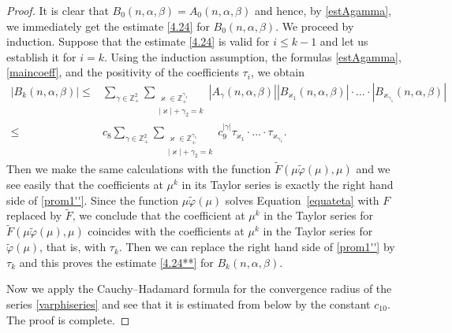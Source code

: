 \documentclass[10pt,a4paper]{amsart}
\def\a{\alpha}
\def\b{\beta}
\begin{document}
\begin{proof}
It is clear that $B_0(n,\a,\b)=A_0(n,\a,\b)$ and hence, by \eqref{estAgamma}, we immediately get
the estimate \eqref{4.24} for $B_0(n,\a,\b)$. We proceed by induction. Suppose that the estimate
\eqref{4.24} is valid for  $i\leqslant k-1$ and let us establish it for $i=k$. Using the induction assumption,
the formulas \eqref{estAgamma}, \eqref{maincoeff}, and the positivity of the coefficients $\tau_i$, we obtain
\begin{equation}\label{prom1''}
\begin{aligned}
|B_k(n,\a,\b)|\leqslant & \sum\limits_{\gamma\in\mathds{Z}_+^2}
\sum\limits_{\substack{\varkappa\in\mathds{Z}_+^{\gamma_1} \\ |\varkappa|+\gamma_2=k}}
|A_\gamma(n,\a,\b)||B_{\varkappa_1}(n,\a,\b)|\cdot\dots\cdot |B_{\varkappa_{\gamma_1}}(n,\a,\b)|
\\
\leqslant & c_{8}\sum\limits_{\gamma\in\mathds{Z}_+^2}
\sum\limits_{\substack{\varkappa\in\mathds{Z}_+^{\gamma_1} \\ |\varkappa|+\gamma_2=k}}
c_{9}^{|\gamma|}\tau_{\varkappa_1}\cdot\dots\cdot\tau_{\varkappa_{\gamma_1}}.
\end{aligned}
\end{equation}
Then we make the same calculations with the function
$\widetilde{F}(\mu\widetilde{\varphi}(\mu), \mu)$ and we see easily that the coefficients at $\mu^k$ in its Taylor series is exactly the right hand side of \eqref{prom1''}. Since the function $\mu\widetilde{\varphi}(\mu)$ solves Equation~\eqref{equateta}
with $F$ replaced by $\widetilde{F}$, we conclude that the coefficient at $\mu^k$ in the Taylor series for $\widetilde{F}(\mu\widetilde{\varphi}(\mu), \mu)$ coincides with the coefficients at $\mu^k$ in the Taylor series for $\widetilde{\varphi}(\mu)$, that is, with $\tau_k$. Then we can replace the right hand side of \eqref{prom1''} by $\tau_k$ and this proves the estimate \eqref{4.24**}
for $B_k(n, \alpha, \beta)$.

Now we apply the Cauchy--Hadamard formula for the convergence radius of the series \eqref{varphiseries} and see that it is estimated from below by the constant $c_{10}$. The proof is complete.
\end{proof}
\end{document}
